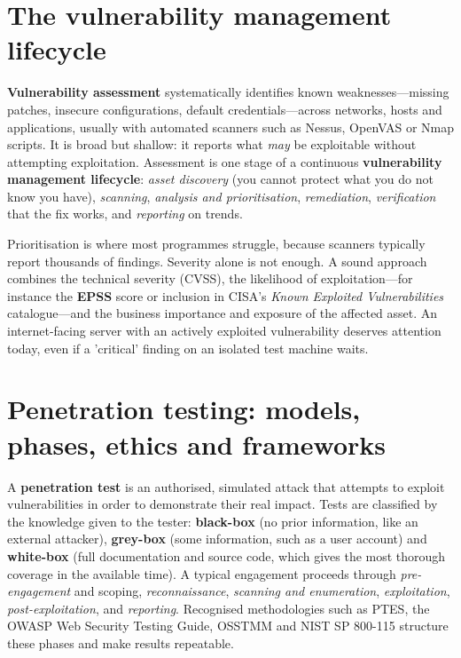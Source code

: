 \section{The vulnerability management lifecycle}\label{sec:10.3}
\textbf{Vulnerability assessment} systematically identifies known weaknesses—missing patches, insecure configurations, default credentials—across networks, hosts and applications, usually with automated scanners such as Nessus, OpenVAS or Nmap scripts. It is broad but shallow: it reports what \emph{may} be exploitable without attempting exploitation. Assessment is one stage of a continuous \textbf{vulnerability management lifecycle}: \emph{asset discovery} (you cannot protect what you do not know you have), \emph{scanning}, \emph{analysis and prioritisation}, \emph{remediation}, \emph{verification} that the fix works, and \emph{reporting} on trends.

Prioritisation is where most programmes struggle, because scanners typically report thousands of findings. Severity alone is not enough. A sound approach combines the technical severity (CVSS), the likelihood of exploitation—for instance the \textbf{EPSS} score or inclusion in CISA's \emph{Known Exploited Vulnerabilities} catalogue—and the business importance and exposure of the affected asset. An internet-facing server with an actively exploited vulnerability deserves attention today, even if a 'critical' finding on an isolated test machine waits.

\section{Penetration testing: models, phases, ethics and frameworks}\label{sec:10.4}
A \textbf{penetration test} is an authorised, simulated attack that attempts to exploit vulnerabilities in order to demonstrate their real impact. Tests are classified by the knowledge given to the tester: \textbf{black-box} (no prior information, like an external attacker), \textbf{grey-box} (some information, such as a user account) and \textbf{white-box} (full documentation and source code, which gives the most thorough coverage in the available time). A typical engagement proceeds through \emph{pre-engagement} and scoping, \emph{reconnaissance}, \emph{scanning and enumeration}, \emph{exploitation}, \emph{post-exploitation}, and \emph{reporting}. Recognised methodologies such as PTES, the OWASP Web Security Testing Guide, OSSTMM and NIST SP 800-115 structure these phases and make results repeatable.

